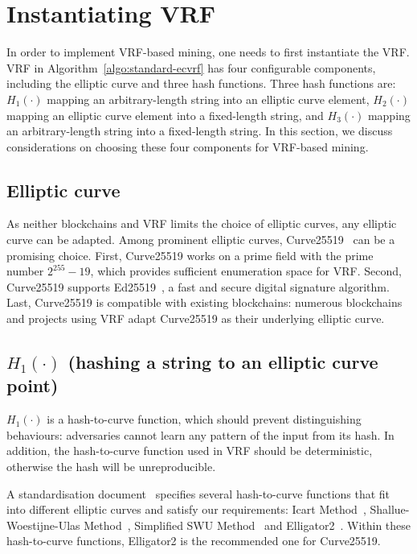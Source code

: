 \section{Instantiating VRF}
\label{sec:instantiation}

In order to implement VRF-based mining, one needs to first instantiate the VRF.
VRF in Algorithm~\ref{algo:standard-ecvrf} has four configurable components, including the elliptic curve and three hash functions.
Three hash functions are:
$H_{1}(\cdot)$ mapping an arbitrary-length string into an elliptic curve element,
$H_{2}(\cdot)$ mapping an elliptic curve element into a fixed-length string, and
$H_{3}(\cdot)$ mapping an arbitrary-length string into a fixed-length string.
In this section, we discuss considerations on choosing these four components for VRF-based mining.





\subsection{Elliptic curve}

As neither blockchains and VRF limits the choice of elliptic curves, any elliptic curve can be adapted.
Among prominent elliptic curves, Curve25519~\cite{bernstein2006curve25519} can be a promising choice.
First, Curve25519 works on a prime field with the prime number $2^{255} - 19$, which provides sufficient enumeration space for VRF.
Second, Curve25519 supports Ed25519~\cite{bernstein2012high}, a fast and secure digital signature algorithm.
Last, Curve25519 is compatible with existing blockchains: numerous blockchains and projects using VRF adapt Curve25519 as their underlying elliptic curve.




\subsection{$H_{1}(\cdot)$ (hashing a string to an elliptic curve point)}

$H_{1}(\cdot)$ is a hash-to-curve function, which should prevent distinguishing behaviours: adversaries cannot learn any pattern of the input from its hash.
In addition, the hash-to-curve function used in VRF should be deterministic, otherwise the hash will be unreproducible.

A standardisation document~\cite{scott2019hashing} specifies several hash-to-curve functions that fit into different elliptic curves and satisfy our requirements: Icart Method~\cite{icart2009hash}, Shallue-Woestijne-Ulas Method~\cite{ulas2007rational}, Simplified SWU Method~\cite{brier2010efficient} and Elligator2~\cite{bernstein2013elligator}.
Within these hash-to-curve functions, Elligator2 is the recommended one for Curve25519.




